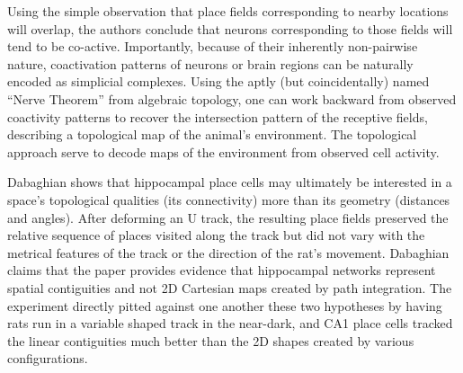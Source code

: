 \documentclass[onecollarge,runningheads]{svjour2}
\begin{document}

Using the simple observation that place fields corresponding to nearby locations will overlap, the authors conclude that neurons corresponding to those fields will tend to be co-active. Importantly, because of their inherently non-pairwise nature, coactivation patterns of neurons or brain regions can be naturally encoded as simplicial complexes.
Using the aptly (but coincidentally) named “Nerve Theorem” from algebraic topology, one can work backward from observed coactivity patterns to recover the intersection pattern of the receptive fields, describing a topological map of the animal’s environment.
The topological approach serve to decode maps of the environment from observed cell activity.

Dabaghian \cite{dabaghian2014reconceiving} shows that hippocampal place cells may ultimately be interested in a space's topological qualities (its connectivity) more than its geometry (distances and angles). After deforming an U track, the resulting place fields preserved the relative sequence of places visited along the track but did not vary with the metrical features of the track or the direction of the rat's movement.
Dabaghian claims that the paper provides evidence that hippocampal networks represent spatial contiguities and not 2D Cartesian maps created by path integration. The experiment directly pitted against one another these two hypotheses by having rats run in a variable shaped track in the near-dark, and CA1 place cells tracked the linear contiguities much better than the 2D shapes created by various configurations.

\begin{acknowledgements}

\end{acknowledgements}


\end{document}
